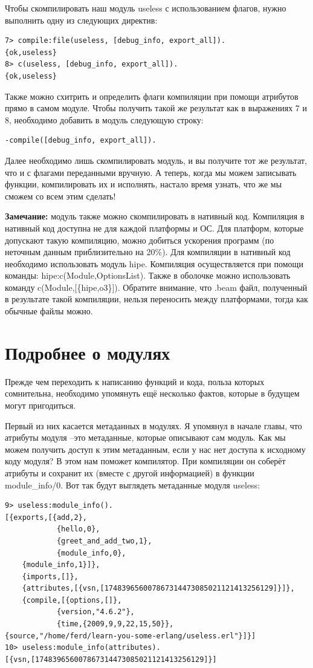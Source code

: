 \documentclass[a4paper,12pt]{report}
\newcommand{\ops}{\colorbox{lgreen}}
\begin{document}
Чтобы скомпилировать наш модуль \ops{useless} с использованием флагов, нужно выполнить одну из следующих директив:
\begin{lstlisting}[style=erlang]
7> compile:file(useless, [debug_info, export_all]).
{ok,useless}
8> c(useless, [debug_info, export_all]).
{ok,useless}
\end{lstlisting}

Также можно схитрить и определить флаги компиляции при помощи атрибутов прямо в самом модуле. Чтобы получить такой же результат как в выражениях 7 и 8, необходимо добавить в модуль следующую строку: 
\begin{lstlisting}[style=erlang]
-compile([debug_info, export_all]).
\end{lstlisting}

Далее необходимо лишь скомпилировать модуль, и вы получите тот же результат, что и с флагами переданными вручную. А теперь, когда мы можем записывать функции, компилировать их и исполнять, настало время узнать, что же мы сможем со всем этим сделать!\\ 
\colorbox{lgray}
{
    \begin{minipage}{1\linewidth}
        \textbf{Замечание:} модуль также можно скомпилировать в нативный код. Компиляция в нативный код доступна не для каждой платформы и ОС. Для платформ, которые допускают такую компиляцию, можно добиться ускорения программ (по неточным данным приблизительно на 20\%). Для компиляции в нативный код необходимо использовать модуль \ops{hipe}. Компиляция осуществляется при помощи команды: \ops{hipe:c(Module,OptionsList).} Также в оболочке можно использовать команду \ops{c(Module,[\{hipe,o3\}]).} Обратите внимание, что .beam файл, полученный в результате такой компиляции, нельзя переносить между платформами, тогда как обычные файлы можно.
    \end{minipage}
}
\section{Подробнее о модулях}
Прежде чем переходить к написанию функций и кода, польза которых сомнительна, необходимо упомянуть ещё несколько фактов, которые в будущем могут пригодиться.

Первый из них касается метаданных в модулях. Я упомянул в начале главы, что атрибуты модуля \---это метаданные, которые описывают сам модуль. Как мы можем получить доступ к этим метаданным, если у нас нет доступа к исходному коду модуля? В этом нам поможет компилятор. При компиляции он соберёт атрибуты и сохранит их (вместе с другой информацией) в функции \ops{module\_info/0}. Вот так будут выглядеть метаданные модуля \ops{useless}:
\begin{lstlisting}[style=erlang]
9> useless:module_info().
[{exports,[{add,2},
            {hello,0},
            {greet_and_add_two,1},
            {module_info,0},
    {module_info,1}]},
    {imports,[]},
    {attributes,[{vsn,[174839656007867314473085021121413256129]}]},
    {compile,[{options,[]},
            {version,"4.6.2"},
            {time,{2009,9,9,22,15,50}},
{source,"/home/ferd/learn-you-some-erlang/useless.erl"}]}]
10> useless:module_info(attributes).
[{vsn,[174839656007867314473085021121413256129]}]
\end{lstlisting}
\end{document}
